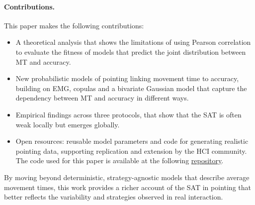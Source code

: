 \documentclass[acmlarge, manuscript,review]{acmart}
\begin{document}
\paragraph{Contributions.}
This paper makes the following contributions:
\begin{itemize}
  \item A theoretical analysis that shows the limitations of using Pearson correlation to evaluate the fitness of models that predict the joint distribution between MT and accuracy.
  \item New probabilistic models of pointing linking movement time to accuracy, building on EMG, copulas and a bivariate Gaussian model that capture the dependency between MT and accuracy in different ways.
  \item Empirical findings across three protocols, that show that the SAT is often weak locally but emerges globally.
  \item Open resources: reusable model parameters and code for generating realistic pointing data, supporting replication and extension by the HCI community. The code used for this paper is available at the following \href{https://github.com/jgori-ouistiti/pointing_models}{\color{blue} repository}.
\end{itemize}

By moving beyond deterministic, strategy-agnostic models that describe average movement times, this work provides a richer account of the SAT in pointing that better reflects the variability and strategies observed in real interaction.



\end{document}
